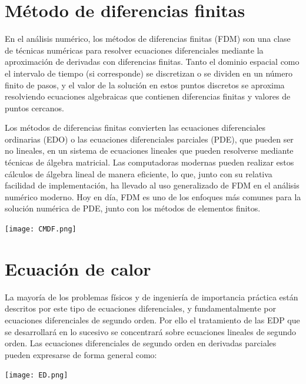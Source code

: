 \documentclass[12pt]{article}
\begin{document}
\section{Método de diferencias finitas}

En el análisis numérico, los métodos de diferencias finitas (FDM) son una clase de técnicas numéricas para resolver ecuaciones diferenciales mediante la aproximación de derivadas con diferencias finitas. Tanto el dominio espacial como el intervalo de tiempo (si corresponde) se discretizan o se dividen en un número finito de pasos, y el valor de la solución en estos puntos discretos se aproxima resolviendo ecuaciones algebraicas que contienen diferencias finitas y valores de puntos cercanos.

Los métodos de diferencias finitas convierten las ecuaciones diferenciales ordinarias (EDO) o las ecuaciones diferenciales parciales (PDE), que pueden ser no lineales, en un sistema de ecuaciones lineales que pueden resolverse mediante técnicas de álgebra matricial. Las computadoras modernas pueden realizar estos cálculos de álgebra lineal de manera eficiente, lo que, junto con su relativa facilidad de implementación, ha llevado al uso generalizado de FDM en el análisis numérico moderno. Hoy en día, FDM es uno de los enfoques más comunes para la solución numérica de PDE, junto con los métodos de elementos finitos.

\begin{center}
    \texttt{[image: CMDF.png]}
\end{center}




\section{Ecuación de calor}

La mayoría de los problemas físicos y de ingeniería de importancia práctica están descritos por este tipo de ecuaciones diferenciales, y fundamentalmente por ecuaciones diferenciales de segundo orden. Por ello el tratamiento de las EDP que se desarrollará en lo sucesivo se concentrará sobre ecuaciones lineales de segundo orden. Las ecuaciones diferenciales de segundo orden en derivadas parciales pueden expresarse de forma general como: 

\begin{center}
    \texttt{[image: ED.png]}\\
\end{center}
\end{document}
